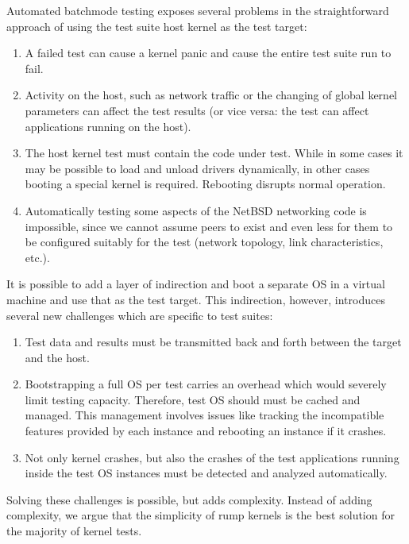 Automated batchmode testing exposes several problems in the straightforward
approach of using the test suite host kernel as the test target:

\begin{enumerate}
\item   A failed test can cause a kernel panic and cause the
	entire test suite run to fail.

\item   Activity on the host, such as network traffic or the changing
	of global kernel parameters can affect the test results
	(or vice versa: the test can affect applications running
	on the host).

\item   The host kernel test must contain the code under test.
	While in some cases it may be possible to load and unload
	drivers dynamically, in other cases booting a special kernel
	is required.  Rebooting disrupts normal operation.

\item   Automatically testing \eg some aspects of the NetBSD
	networking code is impossible, since we cannot assume peers
	to exist and even less for them to be configured suitably
	for the test (network topology, link characteristics, etc.).
\end{enumerate}

It is possible to add a layer of indirection and boot a separate
OS in a virtual machine and use that as the test target.  This indirection,
however, introduces several new challenges which are specific to
test suites:

\begin{enumerate}
\item   Test data and results must be transmitted back and forth
	between the target and the host.

\item   Bootstrapping a full OS per test carries an overhead which
	would severely limit testing capacity.  Therefore, test OS
	should must be cached and managed.  This management involves issues
	like tracking the incompatible features provided by each
	instance and rebooting an instance if it crashes.

\item   Not only kernel crashes, but also the crashes of the test
	applications running inside the test OS instances must be
	detected and analyzed automatically.
\end{enumerate}

Solving these challenges is possible, but adds complexity.  Instead
of adding complexity, we argue that the simplicity of rump kernels
is the best solution for the majority of kernel tests.

